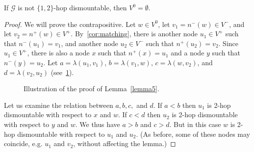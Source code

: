 \documentclass[USenglish, a4paper, thm-restate,numberwithinsect, cleveref]{lipics-v2021}
\newcommand{\G}{\ensuremath{\mathcal{G}}\xspace}
\begin{document}
\begin{lemma}\label{lemma5}
  If $\G$ is not $\{1,2\}$-hop dismountable, then $V^0 = \emptyset$.
\end{lemma}
\begin{proof} We will prove the contrapositive.
Let $w\in V^0$, let $v_1=n^-(w) \in V^-$, and let $v_2=n^+(w) \in V^+$.
By~\cref{cor:matching}, there is another node $u_1\in V^+$ such that $n^-(u_1)=v_1$, and another node $u_2 \in V^-$ such that $n^+(u_2)=v_2$. Since $u_1\in V^+$, there is also a node $x$ such that $n^+(x)=u_1$ and a node $y$ such that $n^-(y)=u_2$. Let $a=\lambda(u_1,v_1)$, $b=\lambda(v_1,w)$, $c=\lambda(w,v_2)$, and $d=\lambda(v_2,u_2)$ (see~\cref{fig:complex-2-hop}).
\begin{figure}[h]
    \begin{center}
\caption{\label{fig:complex-2-hop}Illustration of the proof of Lemma~\ref{lemma5}.}
\end{center}
\end{figure}
Let us examine the relation between $a,b,c,$ and $d$.
    If $a<b$ then $u_1$ is 2-hop dismountable with respect to $x$ and $w$. If $c<d$ then $u_2$ is 2-hop dismountable with respect to $y$ and $w$. We thus have $a > b$ and $c>d$. But in this case $w$ is 2-hop dismountable with respect to $u_1$ and $u_2$. (As before, some of these nodes may coincide, e.g. $u_1$ and $v_2$, without affecting the lemma.)
\end{proof}
\end{document}
